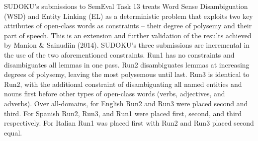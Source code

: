 SUDOKU's submissions to SemEval Task 13 treats Word Sense Disambiguation (WSD) and Entity Linking (EL) as a deterministic problem that exploits two key attributes of open-class words as constraints -- their degree of polysemy and their part of speech. This is an extension and further validation of the results achieved by Manion \& Sainudiin (2014). SUDOKU's three submissions are incremental in the use of the two aforementioned constraints. Run1 has no constraints and disambiguates all lemmas in one pass. Run2 disambiguates lemmas at increasing degrees of polysemy, leaving the most polysemous until last. Run3 is identical to Run2, with the additional constraint of disambiguating all named entities and nouns first before other types of open-class words (verbs, adjectives, and adverbs). Over all-domains, for English Run2 and Run3 were placed second and third. For Spanish Run2, Run3, and Run1 were placed first, second, and third respectively. For Italian Run1 was placed first with Run2 and Run3 placed second equal.
